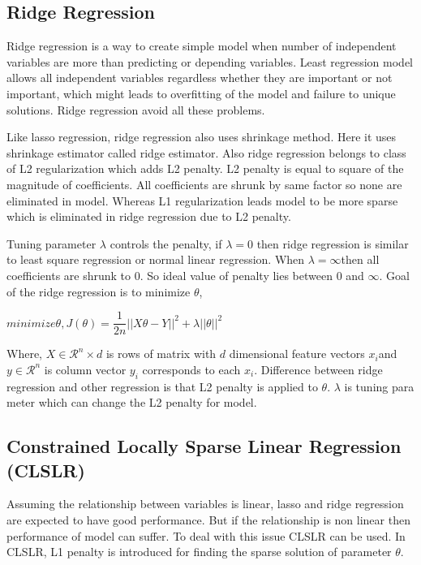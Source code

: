 \subsection{Ridge Regression}
Ridge regression is a way to create simple model when number of independent variables are more than predicting or depending variables. Least regression model allows all independent variables regardless whether they are important or not important, which might leads to overfitting of the model and failure to unique solutions. Ridge regression avoid all these problems. 

\par Like lasso regression, ridge regression also uses shrinkage method. Here it uses shrinkage estimator called ridge estimator. Also ridge regression belongs to class of L2 regularization which adds L2 penalty. L2 penalty is equal to square of the magnitude of coefficients. All coefficients are shrunk by same factor so none are eliminated in model. Whereas L1 regularization leads model to be more sparse which is eliminated in ridge regression due to L2 penalty. 

\par Tuning parameter $\lambda$ controls the penalty, if $\lambda = 0$ then ridge regression is similar to least square regression or normal linear regression. When $\lambda = \infty$then all coefficients are shrunk to 0. So ideal value of penalty lies between 0 and $\infty$. Goal of the ridge regression is to minimize $\theta$,

$minimize \theta,  J(\theta)=\dfrac{1}{2n} || X\theta - Y||^{2} + \lambda||\theta||^2$ 

Where, $X \in \mathcal{R}^n \times d$ is rows of matrix with $d$ dimensional feature vectors $x_{i}$and $y \in \mathcal{R}^n$ is column vector $y_{i}$ corresponds to each $x_{i}$. Difference between ridge regression and other regression is that L2 penalty is applied to $\theta$. $\lambda$ is tuning para meter which can change the L2 penalty for model. 

\subsection{Constrained Locally Sparse Linear Regression (CLSLR)}
Assuming the relationship between variables is linear, lasso and ridge regression are expected to have good performance. But if the relationship is non linear then performance of model can suffer. To deal with this issue CLSLR can be used. In CLSLR, L1 penalty is introduced for finding the sparse solution of parameter $\theta$.

